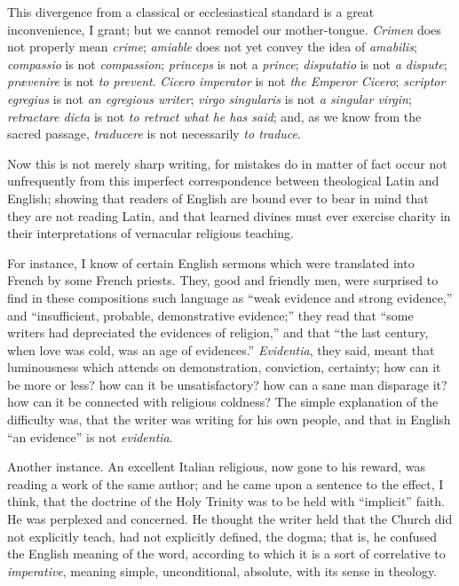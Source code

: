 This divergence from a classical or ecclesiastical
standard is a great inconvenience, I grant; but we cannot remodel our
mother-tongue. \emph{Crimen} does not properly mean \emph{crime}; \emph{amiable}
does not yet convey the idea of \emph{amabilis}; \emph{compassio} is not
\emph{compassion}; \emph{princeps} is not a \emph{prince}; \emph{disputatio}
is not \emph{a dispute}; \emph{prævenire} is not \emph{to prevent}. \emph{Cicero
imperator} is not \emph{the Emperor Cicero}; \emph{scriptor egregius}
is not \emph{an egregious writer}; \emph{virgo singularis} is not \emph{a
singular virgin}; \emph{retractare dicta} is not \emph{to retract what
he has said}; and, as we know from the sacred passage, \emph{traducere}
is not necessarily \emph{to traduce}.

Now this is not merely sharp writing, for mistakes
do in matter of fact occur not unfrequently from this imperfect
correspondence between theological Latin and English; showing that
readers of English are bound ever to bear in mind that they are not
reading Latin, and that learned divines must ever exercise charity in
their interpretations of vernacular religious teaching.

For instance, I know of certain English sermons
which were translated into French by some French priests. They, good and
friendly men, were surprised to find in these compositions such language
as ``weak evidence and strong evidence,'' and ``insufficient, probable,
demonstrative evidence;'' they read that ``some writers had depreciated
the evidences of religion,'' and that ``the last century, when love was
cold, was an age of evidences.'' \emph{Evidentia}, they said, meant that
luminousness which attends on demonstration, conviction, certainty; how
can it be more or less? how can it be unsatisfactory? how can a sane man
disparage it? how can it be connected with religious coldness? The
simple explanation of the difficulty was, that the writer was writing
for his own people, and that in English ``an evidence'' is not \emph{evidentia}.

Another instance. An excellent Italian religious,
now gone to his reward, was reading a work of the same author; and he
came upon a sentence to the effect, I think, that the doctrine of the
Holy Trinity was to be held with ``implicit'' faith. He was perplexed and
concerned. He thought the writer held that the Church did not explicitly
teach, had not explicitly defined, the dogma; that is, he confused the
English meaning of the word, according to which it is a sort of
correlative to \emph{imperative}, meaning simple, unconditional,
absolute, with its sense in theology.


